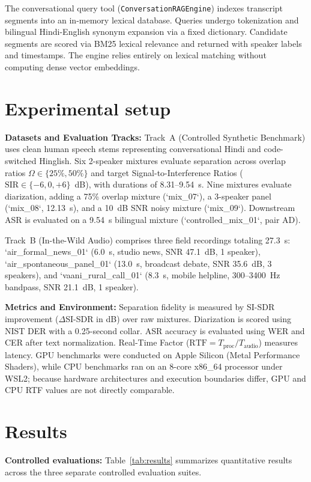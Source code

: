 \documentclass[11pt,a4paper,twocolumn]{article}
\begin{document}
The conversational query tool (\texttt{ConversationRAGEngine}) indexes transcript segments into an in-memory lexical database. Queries undergo tokenization and bilingual Hindi-English synonym expansion via a fixed dictionary. Candidate segments are scored via BM25 lexical relevance and returned with speaker labels and timestamps. The engine relies entirely on lexical matching without computing dense vector embeddings.

\section{Experimental setup}
\noindent\textbf{Datasets and Evaluation Tracks:} Track~A (Controlled Synthetic Benchmark) uses clean human speech stems representing conversational Hindi and code-switched Hinglish. Six 2-speaker mixtures evaluate separation across overlap ratios $\Omega \in \{25\%, 50\%\}$ and target Signal-to-Interference Ratios ($\text{SIR} \in \{-6, 0, +6\}$~dB), with durations of 8.31--9.54~s. Nine mixtures evaluate diarization, adding a 75\% overlap mixture (`mix\_07`), a 3-speaker panel (`mix\_08`, 12.13~s), and a 10~dB SNR noisy mixture (`mix\_09`). Downstream ASR is evaluated on a 9.54~s bilingual mixture (`controlled\_mix\_01`, pair AD).

Track~B (In-the-Wild Audio) comprises three field recordings totaling 27.3~s: `air\_formal\_news\_01` (6.0~s, studio news, SNR 47.1~dB, 1 speaker), `air\_spontaneous\_panel\_01` (13.0~s, broadcast debate, SNR 35.6~dB, 3 speakers), and `vaani\_rural\_call\_01` (8.3~s, mobile helpline, 300--3400~Hz bandpass, SNR 21.1~dB, 1 speaker).

\noindent\textbf{Metrics and Environment:} Separation fidelity is measured by SI-SDR improvement ($\Delta$SI-SDR in dB) over raw mixtures. Diarization is scored using NIST DER with a 0.25-second collar. ASR accuracy is evaluated using WER and CER after text normalization. Real-Time Factor ($\text{RTF} = T_{\text{proc}} / T_{\text{audio}}$) measures latency. GPU benchmarks were conducted on Apple Silicon (Metal Performance Shaders), while CPU benchmarks ran on an 8-core x86\_64 processor under WSL2; because hardware architectures and execution boundaries differ, GPU and CPU RTF values are not directly comparable.

\section{Results}
\noindent\textbf{Controlled evaluations:} Table~\ref{tab:results} summarizes quantitative results across the three separate controlled evaluation suites.
\end{document}
